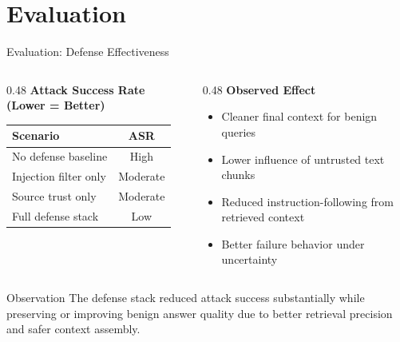 \documentclass[aspectratio=169]{beamer}
\begin{document}
\section{Evaluation}
\begin{frame}{Evaluation: Defense Effectiveness}
    \small
    \begin{columns}[t]
        \begin{column}{0.48\textwidth}
            \textbf{Attack Success Rate (Lower = Better)}
            \vspace{0.2cm}
            \begin{tabularx}{\textwidth}{|X|c|}
                \hline
                \textbf{Scenario} & \textbf{ASR} \\ \hline
                No defense baseline & High \\ \hline
                Injection filter only & Moderate \\ \hline
                Source trust only & Moderate \\ \hline
                Full defense stack & Low \\ \hline
            \end{tabularx}
        \end{column}
        \begin{column}{0.48\textwidth}
            \textbf{Observed Effect}
            \begin{itemize}
                \item Cleaner final context for benign queries
                \item Lower influence of untrusted text chunks
                \item Reduced instruction-following from retrieved context
                \item Better failure behavior under uncertainty
            \end{itemize}
        \end{column}
    \end{columns}
    \vspace{0.25cm}
    \begin{alertblock}{Observation}
        The defense stack reduced attack success substantially while preserving or improving benign answer quality due to better retrieval precision and safer context assembly.
    \end{alertblock}
\end{frame}
\end{document}
